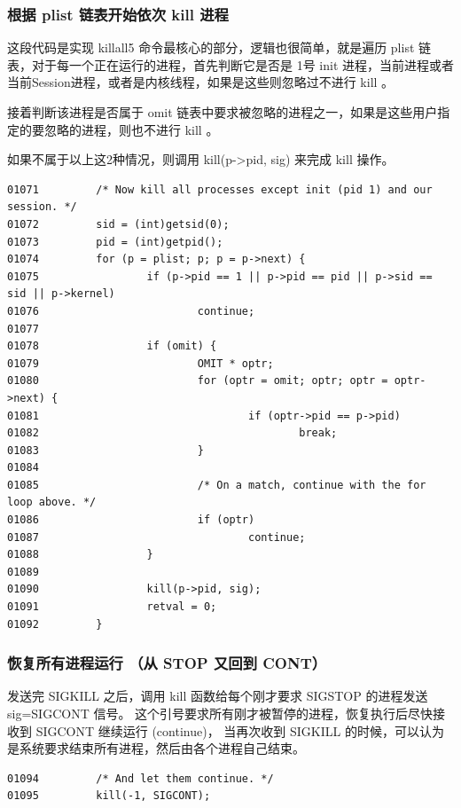 \subsubsection{根据 plist 链表开始依次 kill 进程}

这段代码是实现 killall5 命令最核心的部分，逻辑也很简单，就是遍历 plist
链表，对于每一个正在运行的进程，首先判断它是否是 1号 init
进程，当前进程或者当前Session进程，或者是内核线程，如果是这些则忽略过不进行
kill 。

接着判断该进程是否属于 omit
链表中要求被忽略的进程之一，如果是这些用户指定的要忽略的进程，则也不进行
kill 。

如果不属于以上这2种情况，则调用 kill(p-\textgreater{}pid, sig) 来完成
kill 操作。

{\begin{shaded}\begin{verbatim}
01071         /* Now kill all processes except init (pid 1) and our session. */
01072         sid = (int)getsid(0);
01073         pid = (int)getpid();
01074         for (p = plist; p; p = p->next) {
01075                 if (p->pid == 1 || p->pid == pid || p->sid == sid || p->kernel)
01076                         continue;
01077 
01078                 if (omit) {
01079                         OMIT * optr;
01080                         for (optr = omit; optr; optr = optr->next) {
01081                                 if (optr->pid == p->pid)
01082                                         break;
01083                         }
01084 
01085                         /* On a match, continue with the for loop above. */
01086                         if (optr)
01087                                 continue;
01088                 }
01089 
01090                 kill(p->pid, sig);
01091                 retval = 0;
01092         }
\end{verbatim}\end{shaded}}
\subsubsection{恢复所有进程运行 （从 STOP 又回到 CONT）}

发送完 SIGKILL 之后，调用 kill 函数给每个刚才要求 SIGSTOP 的进程发送
sig=SIGCONT 信号。 这个引号要求所有刚才被暂停的进程，恢复执行后尽快接收到
SIGCONT 继续运行 (continue)， 当再次收到 SIGKILL
的时候，可以认为是系统要求结束所有进程，然后由各个进程自己结束。

{\begin{shaded}\begin{verbatim}
01094         /* And let them continue. */
01095         kill(-1, SIGCONT);
\end{verbatim}\end{shaded}}
